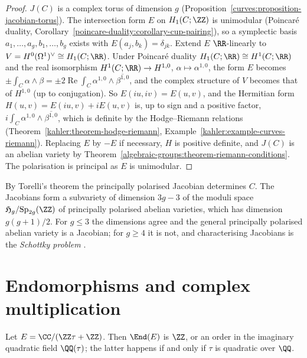 \begin{proof}
$J(C)$ is a complex torus of dimension $g$ (Proposition~\ref{curves:proposition-jacobian-torus}). The intersection form $E$ on $H_1(C; \ZZ)$ is unimodular (Poincar\'e duality,
Corollary~\ref{poincare-duality:corollary-cup-pairing}), so a symplectic basis $a_1, \ldots, a_g, b_1, \ldots, b_g$ exists with $E(a_j, b_k) = \delta_{jk}$. Extend $E$ $\RR$-linearly to
$V = H^0(\Omega^1)^\vee \cong H_1(C; \RR)$. Under Poincar\'e duality $H_1(C; \RR) \cong H^1(C; \RR)$ and the real isomorphism $H^1(C; \RR) \to H^{1,0}$, $\alpha \mapsto \alpha^{1,0}$,
the form $E$ becomes $\pm\int_C\alpha \wedge \beta = \pm 2\operatorname{Re}\int_C\alpha^{1,0} \wedge \overline{\beta^{1,0}}$, and the complex structure of $V$ becomes that of $H^{1,0}$ (up to
conjugation). So $E(iu, iv) = E(u, v)$, and the Hermitian form $H(u, v) = E(iu, v) + iE(u, v)$ is, up to sign and a positive factor, $i\int_C\alpha^{1,0} \wedge \overline{\beta^{1,0}}$, which
is definite by the Hodge--Riemann relations (Theorem~\ref{kahler:theorem-hodge-riemann}, Example~\ref{kahler:example-curves-riemann}). Replacing $E$ by $-E$ if
necessary, $H$ is positive definite, and $J(C)$ is an abelian variety by Theorem~\ref{algebraic-groups:theorem-riemann-conditions}. The polarisation is principal as $E$ is unimodular.
\end{proof}

\begin{remark}\label{algebraic-groups:remark-torelli-schottky}
By Torelli's theorem the principally polarised Jacobian determines $C$. The Jacobians form a subvariety of dimension $3g - 3$ of the moduli space $\mathfrak{H}_g/\mathrm{Sp}_{2g}(\ZZ)$ of
principally polarised abelian varieties, which has dimension $g(g + 1)/2$. For $g \leq 3$ the dimensions agree and the general principally polarised abelian variety is a Jacobian;
for $g \geq 4$ it is not, and characterising Jacobians is the \emph{Schottky problem} \cite{birkenhake-lange}.
\end{remark}

\section{Endomorphisms and complex multiplication}\label{algebraic-groups:section-endomorphisms}

\begin{proposition}\label{algebraic-groups:proposition-elliptic-endomorphisms}
Let $E = \CC/(\ZZ\tau + \ZZ)$. Then $\End(E)$ is $\ZZ$, or an order in the imaginary quadratic field $\QQ(\tau)$; the latter happens if and only if $\tau$ is quadratic over $\QQ$.
\end{proposition}

